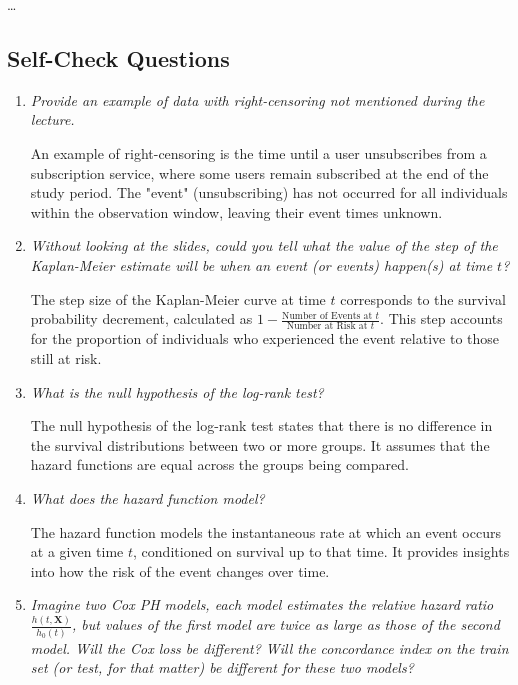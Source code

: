 \documentclass[a4paper]{article}
\begin{document}
\dots

\subsection*{Self-Check Questions}

\begin{enumerate}

    \item \textit{Provide an example of data with right-censoring not mentioned during the lecture.}  
    
    An example of right-censoring is the time until a user unsubscribes from a subscription service, where some users remain subscribed at the end of the study period.  
    The "event" (unsubscribing) has not occurred for all individuals within the observation window, leaving their event times unknown.

    \item \textit{Without looking at the slides, could you tell what the value of the step of the Kaplan-Meier estimate will be when an event (or events) happen(s) at time \(t\)?}  
    
    The step size of the Kaplan-Meier curve at time \(t\) corresponds to the survival probability decrement, calculated as \(1 - \frac{\text{Number of Events at } t}{\text{Number at Risk at } t}\).  
    This step accounts for the proportion of individuals who experienced the event relative to those still at risk.  

    \item \textit{What is the null hypothesis of the log-rank test?}  
    
    The null hypothesis of the log-rank test states that there is no difference in the survival distributions between two or more groups.  
    It assumes that the hazard functions are equal across the groups being compared.

    \item \textit{What does the hazard function model?}  
    
    The hazard function models the instantaneous rate at which an event occurs at a given time \(t\), conditioned on survival up to that time.  
    It provides insights into how the risk of the event changes over time.  

    \item \textit{Imagine two Cox PH models, each model estimates the relative hazard ratio \(\frac{h(t, \mathbf{X})}{h_0(t)}\), but values of the first model are twice as large as those of the second model. Will the Cox loss be different? Will the concordance index on the train set (or test, for that matter) be different for these two models?}  
    

\end{enumerate}
\end{document}
